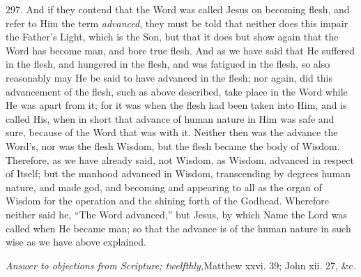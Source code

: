 297.
And if they contend that the Word was called Jesus on becoming flesh,
and refer to Him the term \emph{advanced}, they must be told that
neither does this impair the Father's Light, which is the Son, but
that it does but show again that the Word has become man, and bore
true flesh. And as we have said that He suffered in the flesh, and
hungered in the flesh, and was fatigued in the flesh, so also
reasonably may He be said to have advanced in the flesh; nor again,
did this advancement of the flesh, such as above described, take place
in the Word while He was apart from it; for it was when the flesh had
been taken into Him, and is called His, when in short that advance of
human nature in Him was safe and sure, because of the Word that
was with it. Neither then was the advance the Word's, nor was the
flesh Wisdom, but the flesh became the body of Wisdom. Therefore, as
we have already said, not Wisdom, as Wisdom, advanced in respect of
Itself; but the manhood advanced in Wisdom, transcending by degrees
human nature, and made god, and becoming and appearing to all as the
organ of Wisdom for the operation and the shining forth of the
Godhead. Wherefore neither said he, ``The Word advanced,'' but Jesus, by
which Name the Lord was called when He became man; so that the advance
is of the human nature in such wise as we have above explained.


\emph{Answer
to objections from Scripture; twelfthly,}Matthew
xxvi. 39; John xii. 27, \&c\emph{.}

